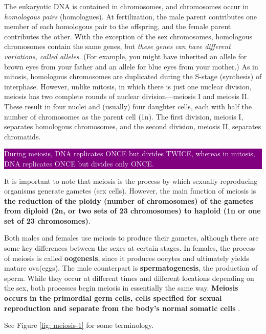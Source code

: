 \documentclass[12pt]{article}
\newcommand{\ctext}[3]{
    \colorbox{#2}{\parbox{0.9\textwidth}{\textcolor{#1}{#3}}}
}
\begin{document}
The eukaryotic DNA is contained in chromosomes, and chromosomes occur in \emph{homologous pairs} (homologues). At fertilization, the male parent contributes one member of each homologous pair to the offspring, and the female parent contributes the other. With the exception of the sex chromosomes, homologous chromosomes contain the same genes, but \emph{these genes can have different variations, called alleles}. (For example, you might have inherited an allele for brown eyes from your father and an allele for blue eyes from your mother.) As in mitosis, homologous chromosomes are duplicated during the S-stage (synthesis) of interphase. However, unlike mitosis, in which there is just one nuclear division, meiosis has two complete rounds of nuclear division—meiosis I and meiosis II. These result in four nuclei and (usually) four daughter cells, each with half the number of chromosomes as the parent cell (1n). The first division, meiosis I, separates homologous chromosomes, and the second division, meiosis II, separates chromatids. 


\ctext{white}{purple}{During meiosis, DNA replicates ONCE but divides TWICE, whereas in mitosis, DNA replicates ONCE but divides only ONCE.}

It is important to note that \cite{embryo-project} meiosis is the process by which sexually reproducing organisms generate gametes (sex cells). However, the main function of meiosis is \textbf{the reduction of the ploidy (number of chromosomes) of the gametes from diploid (2n, or two sets of 23 chromosomes) to haploid (1n or one set of 23 chromosomes)}.

Both males and females use meiosis to produce their gametes, although there are some key differences between the sexes at certain stages. In females, the process of meiosis is called \textbf{oogenesis}, since it produces oocytes and ultimately yields mature ova(eggs). The male counterpart is \textbf{spermatogenesis}, the production of sperm. While they occur at different times and different locations depending on the sex, both processes begin meiosis in essentially the same way. \textbf{Meiosis occurs in the primordial germ cells, cells specified for sexual reproduction and separate from the body’s normal somatic cells}  \cite{embryo-project}.

See Figure \ref{fig: meiosis-1} for some terminology.
\end{document}

